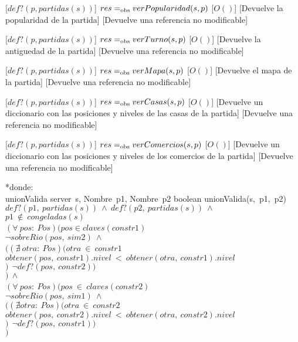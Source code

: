 \begin{Interfaz}
    [$def?(p, partidas(s))$]
    {$res =_{\mathrm{obs}} verPopularidad(s, p)$}
    [$O()$]
    [Devuelve la popularidad de la partida]
    [Devuelve una referencia no modificable]

    [$def?(p, partidas(s))$]
    {$res =_{\mathrm{obs}} verTurno(s, p)$}
    [$O()$]
    [Devuelve la antiguedad de la partida]
    [Devuelve una referencia no modificable]

    [$def?(p, partidas(s))$]
    {$res =_{\mathrm{obs}} verMapa(s, p)$}
    [$O()$]
    [Devuelve el mapa de la partida]
    [Devuelve una referencia no modificable]

    [$def?(p, partidas(s))$]
    {$res =_{\mathrm{obs}} verCasas(s, p)$}
    [$O()$]
    [Devuelve un diccionario con las posiciones y niveles de las casas de la partida]
    [Devuelve una referencia no modificable]

    [$def?(p, partidas(s))$]
    {$res =_{\mathrm{obs}} verComercios(s, p)$}
    [$O()$]
    [Devuelve un diccionario con las posiciones y niveles de los comercios de la partida]
    [Devuelve una referencia no modificable]

    \pagebreak

    *donde: \\
\tadOperacion
    {unionValida}
    {server\ s, Nombre\ p1, Nombre\ p2}
    {boolean}
    {}
\tadAxioma
    {unionValida(s,\ p1,\ p2)}     
    {$
        def?(p1,\ partidas(s))\ \land\ 
        def?(p2,\ partidas(s))\ \land\ $\\$
        p1\ \notin\ congeladas(s)\ $\yluego$\ $\\$
        (\forall\ pos:\ Pos)(pos \in claves(constr1)\ $\impluego\ \\$   
            $\tab$ \neg sobreRio(pos,\ sim2)\ \land\  $\\$
            $\tab$ ((\nexists\ otra:\ Pos)(otra\ \in\ constr1\ $\yluego\ \\$ 
            $\tab\tab$ obtener(pos,\ constr1).nivel\ <\ obtener(otra,\ constr1).nivel $\\$
            $\tab$)\ $\impluego$\ \neg def?(pos,\ constr2))\ $\\$
        )\ \land\ $\\$
        (\forall\ pos:\ Pos)(pos\ \in\ claves(constr2)\ $\impluego\ \\$   
            $\tab$ \neg sobreRio(pos,\ sim1)\ \land\  $\\$
            $\tab$((\nexists otra:\ Pos)(otra\ \in\ constr2\ $\yluego$\ $\\$ 
            $\tab\tab$ obtener(pos,\ constr2).nivel\ <\  obtener(otra,\ constr2).nivel $\\$
            $\tab$)\ $\impluego$\ \neg def?(pos,\ constr1))\ $\\$
        )               
        $}
    

\end{Interfaz}
